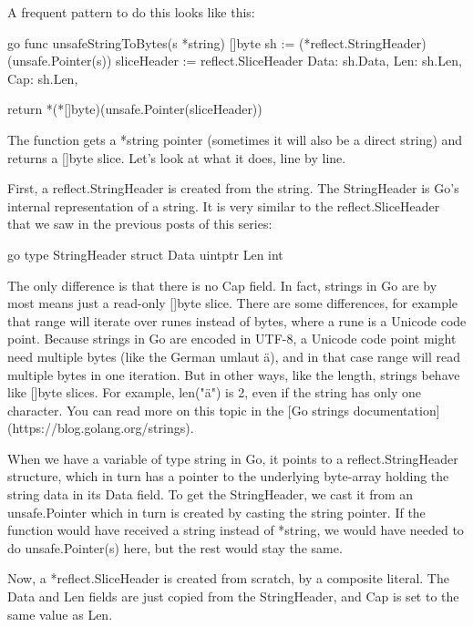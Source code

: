         A frequent pattern to do this looks like this:

        go
        func unsafeStringToBytes(s *string) []byte
        sh := (*reflect.StringHeader)(unsafe.Pointer(s))
        sliceHeader := reflect.SliceHeader
        Data: sh.Data,
        Len:  sh.Len,
        Cap:  sh.Len,

        return *(*[]byte)(unsafe.Pointer(sliceHeader))



        The function gets a *string pointer (sometimes it will also be a direct string) and returns a []byte slice. Let's
        look at what it does, line by line.

        First, a reflect.StringHeader is created from the string. The StringHeader is Go's internal representation of a
        string. It is very similar to the reflect.SliceHeader that we saw in the previous posts of this series:

        go
        type StringHeader struct
        Data uintptr
        Len  int



        The only difference is that there is no Cap field. In fact, strings in Go are by most means just a read-only []byte
        slice. There are some differences, for example that range will iterate over runes instead of bytes, where a rune is
        a Unicode code point. Because strings in Go are encoded in UTF-8, a Unicode code point might need multiple bytes (like
        the German umlaut ä), and in that case range will read multiple bytes in one iteration. But in other ways, like the
        length, strings behave like []byte slices. For example, len("ä") is 2, even if the string has only one character.
        You can read more on this topic in the [Go strings documentation](https://blog.golang.org/strings).

        When we have a variable of type string in Go, it points to a reflect.StringHeader structure, which in turn has a
        pointer to the underlying byte-array holding the string data in its Data field. To get the StringHeader, we cast
        it from an unsafe.Pointer which in turn is created by casting the string pointer. If the function would have received
        a string instead of *string, we would have needed to do unsafe.Pointer(s) here, but the rest would stay the same.

        Now, a *reflect.SliceHeader is created from scratch, by a composite literal. The Data and Len fields are just
        copied from the StringHeader, and Cap is set to the same value as Len.

